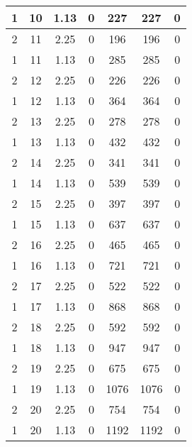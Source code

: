 \documentclass[letterpaper, 12pt]{article}
\begin{document}
\begin{longtable}{|c|c|c|c|c|c|c|}
\hline
1 & 10 & 1.13 & 0 & 227 & 227 & 0 \\
\hline
2 & 11 & 2.25 & 0 & 196 & 196 & 0 \\
\hline
1 & 11 & 1.13 & 0 & 285 & 285 & 0 \\
\hline
2 & 12 & 2.25 & 0 & 226 & 226 & 0 \\
\hline
1 & 12 & 1.13 & 0 & 364 & 364 & 0 \\
\hline
2 & 13 & 2.25 & 0 & 278 & 278 & 0 \\
\hline
1 & 13 & 1.13 & 0 & 432 & 432 & 0 \\
\hline
2 & 14 & 2.25 & 0 & 341 & 341 & 0 \\
\hline
1 & 14 & 1.13 & 0 & 539 & 539 & 0 \\
\hline
2 & 15 & 2.25 & 0 & 397 & 397 & 0 \\
\hline
1 & 15 & 1.13 & 0 & 637 & 637 & 0 \\
\hline
2 & 16 & 2.25 & 0 & 465 & 465 & 0 \\
\hline
1 & 16 & 1.13 & 0 & 721 & 721 & 0 \\
\hline
2 & 17 & 2.25 & 0 & 522 & 522 & 0 \\
\hline
1 & 17 & 1.13 & 0 & 868 & 868 & 0 \\
\hline
2 & 18 & 2.25 & 0 & 592 & 592 & 0 \\
\hline
1 & 18 & 1.13 & 0 & 947 & 947 & 0 \\
\hline
2 & 19 & 2.25 & 0 & 675 & 675 & 0 \\
\hline
1 & 19 & 1.13 & 0 & 1076 & 1076 & 0 \\
\hline
2 & 20 & 2.25 & 0 & 754 & 754 & 0 \\
\hline
1 & 20 & 1.13 & 0 & 1192 & 1192 & 0 \\
\hline
\end{longtable}
\end{document}
